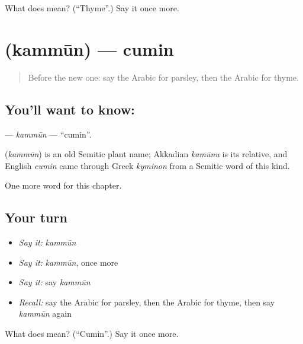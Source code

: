 \begin{tcolorbox}[breakable,colback=teal!4,colframe=teal!35!black,title={Before you move on}]
What does  mean? (\textquotedblleft{}Thyme\textquotedblright{}.) Say it once more.
\end{tcolorbox}
\section[\texorpdfstring{\ar{كمون} (kammūn)}{كمون (kammūn)}]{ (kammūn) — cumin}

\label{lesson:AR-C121-kammun}



\begin{quote}
Before the new one: say the Arabic for parsley, then the Arabic for thyme.
\end{quote}

\subsection*{You'll want to know: }
\textbf{} — \emph{kammūn} — \textquotedblleft{}cumin\textquotedblright{}.

\begin{cousinweb}
\textbf{} (\emph{kammūn}) is an old Semitic plant name; Akkadian \emph{kamūnu} is its relative, and English \emph{cumin} came through Greek \emph{kyminon} from a Semitic word of this kind.
\end{cousinweb}

\begin{grammarlens}[title={What you've built}]
One more word for this chapter.
\end{grammarlens}

\subsection*{Your turn}
\begin{itemize}
\raggedright
  \item \emph{Say it:} \emph{kammūn}
  \item \emph{Say it:} \emph{kammūn}, once more
  \item \emph{Say it:} say \emph{kammūn}
  \item \emph{Recall:} say the Arabic for parsley, then the Arabic for thyme, then say \emph{kammūn} again
\end{itemize}

\begin{tcolorbox}[breakable,colback=teal!4,colframe=teal!35!black,title={Before you move on}]
What does  mean? (\textquotedblleft{}Cumin\textquotedblright{}.) Say it once more.
\end{tcolorbox}
